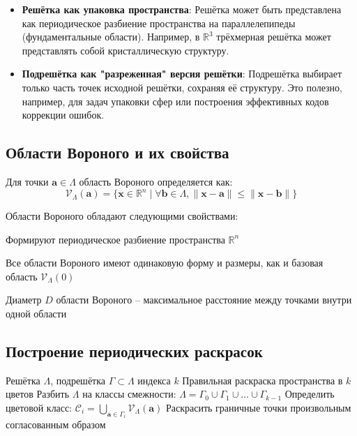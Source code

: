 \documentclass[12pt]{article}
\begin{document}
\begin{itemize}
    \item \textbf{Решётка как упаковка пространства}: 
        Решётка может быть представлена как периодическое разбиение пространства на параллелепипеды (фундаментальные области). Например, в $\mathbb{R}^3$ трёхмерная решётка может представлять собой кристаллическую структуру.
    \item \textbf{Подрешётка как "разреженная" версия решётки}: 
        Подрешётка выбирает только часть точек исходной решётки, сохраняя её структуру. Это полезно, например, для задач упаковки сфер или построения эффективных кодов коррекции ошибок.
\end{itemize}

\subsection{Области Вороного и их свойства}

\begin{definition}
Для точки $\mathbf{a} \in \Lambda$ область Вороного определяется как:
\[
\mathcal{V}_\Lambda(\mathbf{a}) = \{\mathbf{x} \in \mathbb{R}^n \mid \forall \mathbf{b} \in \Lambda, \|\mathbf{x}-\mathbf{a}\| \leq \|\mathbf{x}-\mathbf{b}\|\}
\]
\end{definition}


Области Вороного обладают следующими свойствами:

\item Формируют периодическое разбиение пространства $\mathbb{R}^n$
\item Все области Вороного имеют одинаковую форму и размеры, как и базовая область $\mathcal{V}_\Lambda(0)$
\item Диаметр $D$ области Вороного -- максимальное расстояние между точками внутри одной области



\subsection{Построение периодических раскрасок}

\begin{algorithm}[H]
\caption{Построение периодической раскраски}
\begin{algorithmic}[1]
\REQUIRE Решётка $\Lambda$, подрешётка $\Gamma \subset \Lambda$ индекса $k$
\ENSURE Правильная раскраска пространства в $k$ цветов
\STATE Разбить $\Lambda$ на классы смежности: $\Lambda = \Gamma_0 \cup \Gamma_1 \cup \ldots \cup \Gamma_{k-1}$
\STATE Определить цветовой класс:
$\mathcal{C}_i = \bigcup_{\mathbf{a} \in \Gamma_i} \mathcal{V}_\Lambda(\mathbf{a})$
\ENDFOR
\STATE Раскрасить граничные точки произвольным согласованным образом
\end{algorithmic}
\end{algorithm}
\end{document}

